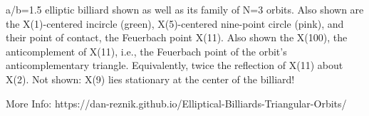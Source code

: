 a/b=1.5 elliptic billiard shown as well as its family of N=3 orbits. Also shown are the X(1)-centered incircle (green), X(5)-centered nine-point circle (pink), and their point of contact, the Feuerbach point X(11). Also shown the X(100), the anticomplement of X(11), i.e., the Feuerbach point of the orbit's anticomplementary triangle. Equivalently, twice the reflection of X(11) about X(2). Not shown: X(9) lies stationary at the center of the billiard!

More Info:  https://dan-reznik.github.io/Elliptical-Billiards-Triangular-Orbits/